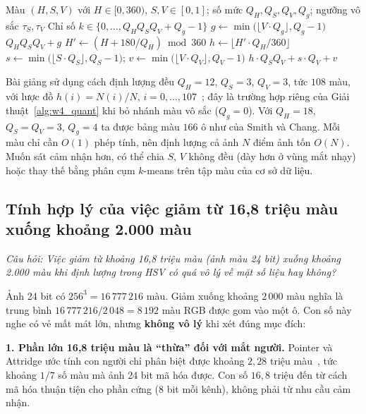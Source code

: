 \begin{algorithm}[ht]
\caption{Định lượng một màu HSV về chỉ số ô}
\label{alg:w4_quant}
\begin{algorithmic}[1]
\Require Màu $(H, S, V)$ với $H \in [0, 360)$, $S, V \in [0, 1]$; số mức $Q_H, Q_S, Q_V, Q_g$; ngưỡng vô sắc $\tau_S, \tau_V$
\Ensure Chỉ số $k \in \{0, \ldots, Q_H Q_S Q_V + Q_g - 1\}$
     
        \State $g \gets \min\big(\lfloor V \cdot Q_g \rfloor, Q_g - 1\big)$
        \State \Return $Q_H Q_S Q_V + g$
    \EndIf
    \State $H' \gets (H + 180/Q_H) \bmod 360$ 
    \State $h \gets \lfloor H' \cdot Q_H / 360 \rfloor$
    \State $s \gets \min\big(\lfloor S \cdot Q_S \rfloor, Q_S - 1\big)$; \quad $v \gets \min\big(\lfloor V \cdot Q_V \rfloor, Q_V - 1\big)$
    \State \Return $h \cdot Q_S Q_V + s \cdot Q_V + v$
\EndFunction
\end{algorithmic}
\end{algorithm}

Bài giảng sử dụng cách định lượng đều $Q_H = 12$, $Q_S = 3$, $Q_V = 3$, tức $108$ màu, với lược đồ $h(i) = N(i)/N$, $i = 0, \ldots, 107$~\citep{xlav_lec2}; đây là trường hợp riêng của Giải thuật~\ref{alg:w4_quant} khi bỏ nhánh màu vô sắc ($Q_g = 0$). Với $Q_H = 18$, $Q_S = Q_V = 3$, $Q_g = 4$ ta được bảng màu $166$ ô như của Smith và Chang. Mỗi màu chỉ cần $O(1)$ phép tính, nên định lượng cả ảnh $N$ điểm ảnh tốn $O(N)$. Muốn sát cảm nhận hơn, có thể chia $S$, $V$ không đều (dày hơn ở vùng mắt nhạy) hoặc thay thế bằng phân cụm $k$-means trên tập màu của cơ sở dữ liệu.

\subsection{Tính hợp lý của việc giảm từ 16,8 triệu màu xuống khoảng 2.000 màu}
\label{subsec:w4_reduce}

\textit{Câu hỏi: Việc giảm từ khoảng 16,8 triệu màu (ảnh màu 24 bit) xuống khoảng 2.000 màu khi định lượng trong HSV có quá vô lý về mặt số liệu hay không?}

Ảnh 24 bit có $256^3 = 16\,777\,216$ màu. Giảm xuống khoảng $2\,000$ màu nghĩa là trung bình $16\,777\,216 / 2\,048 = 8\,192$ màu RGB được gom vào một ô. Con số này nghe có vẻ mất mát lớn, nhưng \textbf{không vô lý} khi xét đúng mục đích:

\textbf{1. Phần lớn 16,8 triệu màu là ``thừa'' đối với mắt người.} Pointer và Attridge ước tính con người chỉ phân biệt được khoảng $2{,}28$ triệu màu~\citep{pointer1998number}, tức khoảng $1/7$ số màu mà ảnh 24 bit mã hóa được. Con số $16{,}8$ triệu đến từ cách mã hóa thuận tiện cho phần cứng ($8$ bit mỗi kênh), không phải từ nhu cầu cảm nhận.

